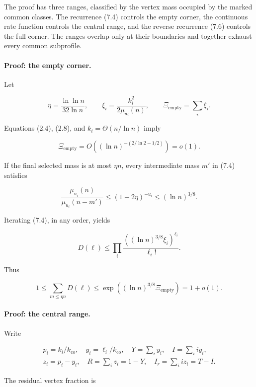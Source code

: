 \documentclass[11pt,reqno]{amsart}
\begin{document}
The proof has three ranges, classified by the vertex mass occupied by the
marked common classes. The recurrence (7.4) controls the empty corner, the
continuous rate function controls the central range, and the reverse
recurrence (7.6) controls the full corner. The ranges overlap only at their
boundaries and together exhaust every common subprofile.

\paragraph{Proof: the empty corner.}\label{proof-the-empty-corner}

Let

 \[
  \eta=\frac{{\ln\ln n}}{32{\ln n}},\qquad
 \xi_i=\frac{k_i^2}{2\mu_{u_i}(n)},\qquad
 \Xi_{\mathrm{empty}}=\sum_i\xi_i.                               \tag{7.8}
 \]

Equations (2.4), (2.8), and \(k_i=\Theta(n/{\ln n})\) imply

\[
 \Xi_{\mathrm{empty}}=O((\ln n)^{-(2/{\ln 2}-1/2)})=o(1).        \tag{7.9}
\]

If the final selected mass is at most \(\eta n\), every
intermediate mass \(m'\) in (7.4) satisfies

\[
 \frac{\mu_{u_i}(n)}{\mu_{u_i}(n-m')}
 \le(1-2\eta)^{-u_i}\le (\ln n)^{3/8}.                        \tag{7.10}
\]

Iterating (7.4), in any order, yields

\[
 D(\ell)\le\prod_i\frac{((\ln n)^{3/8}\xi_i)^{\ell_i}}
                               {\ell_i!}.
\]

Thus

\[
 1\le\sum_{m\le\eta n}D(\ell)
 \le\exp((\ln n)^{3/8}\Xi_{\mathrm{empty}})=1+o(1).       \tag{7.11}
\]

\paragraph{Proof: the central range.}\label{proof-the-central-range}

Write

\[\begin{gathered}
p_i=k_i/k_{\mathrm{co}},\quad y_i=\ell_i/k_{\mathrm{co}},\quad
 Y=\sum_i y_i,\quad I=\sum_i i y_i,\quad\\
z_i=p_i-y_i,\quad R=\sum_i z_i=1-Y,\quad
 I_r=\sum_i i z_i=T-I.
\end{gathered}
\tag{7.12}\]

The residual vertex fraction is
\end{document}
